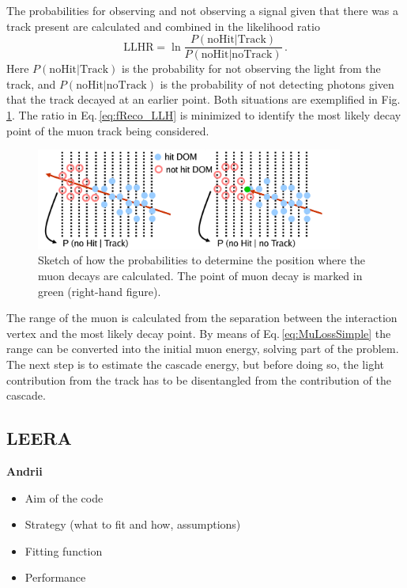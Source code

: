 \documentclass[../Main.tex]{subfiles}
\begin{document}
The probabilities for observing and not observing a signal given that there was a track present are calculated and combined in the likelihood ratio
\begin{equation}
\mathrm{LLHR} = \ln\frac{P(\mathrm{noHit} | \mathrm{Track})}{P(\mathrm{noHit}| \mathrm{noTrack})}\,.
\label{eq:fReco_LLH}
\end{equation}
Here $P(\mathrm{noHit} | \mathrm{Track})$ is the probability for not observing the light from the track, and $P(\mathrm{noHit} | \mathrm{noTrack})$ is the probability of not detecting photons given that the track decayed at an earlier point. Both situations are exemplified in Fig.\,\ref{fig:fReco_LLH}. The ratio in Eq.\,\ref{eq:fReco_LLH} is minimized to identify the most likely decay point of the muon track being considered. 

\begin{figure}[tbh]
  \centering
  \includegraphics[width=0.9\textwidth]{finiteReco3}
  \caption[Determining the muon decay point.]{Sketch of how the probabilities to determine the position where the muon decays are calculated. The point of muon decay is marked in green (right-hand figure).}
  \label{fig:fReco_LLH}
\end{figure}

\vspace*{\baselineskip}
The range of the muon is calculated from the separation between the interaction vertex and the most likely decay point. By means of Eq.\,\ref{eq:MuLossSimple} the range can be converted into the initial muon energy, solving part of the problem. The next step is to estimate the cascade energy, but before doing so, the light contribution from the track has to be disentangled from the contribution of the cascade.

\subsection{LEERA}\label{sec:LEERA}

\textbf{Andrii}

\begin{itemize}
\item Aim of the code
\item Strategy (what to fit and how, assumptions)
\item Fitting function
\item Performance
\end{itemize}
\end{document}
